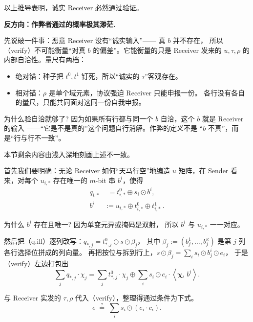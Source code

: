 以上推导表明，诚实 Receiver 必然通过验证。

\textbf{反方向：作弊者通过的概率极其渺茫.}

先说破一件事：恶意 Receiver 没有“诚实输入”------ 真 $b$ 并不存在，
所以（verify）不可能衡量“对真 $b$ 的偏差”。它能衡量的只是 Receiver
发来的 $u, \tau, \rho$ 的内部自洽性。量尺有两档：

\begin{itemize}

\item
  绝对锚：种子把 $t^0, t^1$ 钉死，所以“诚实的 $\tau$”客观存在。
\item
  相对锚：$\rho$ 是单个域元素，协议强迫 Receiver 只能申报一份。
  各行没有各自的量尺，只能共同面对这同一份自我申报。
\end{itemize}

为什么验自洽就够了? 因为如果所有行都与同一个 $b$ 自洽，这个 $b$ 就是
Receiver 的输入 ------“它是不是真的”这个问题自行消解。作弊的定义不是
“$b$ 不真”，而是“行与行不一致”。

本节剩余内容由浅入深地刻画上述不一致。

首先我们要明确：无论 Receiver 如何“天马行空”地编造 $u$ 矩阵，在
Sender 看来，对每个 $u_{i,*}$ 存在唯一的 $m$-bit 串 $b^i$，使得
\begin{align}q_{i,*} &\phantom{:}= t^0_{i,*} \oplus s_i \odot b^{i},
\\
b^i &:= u_{i,*} \oplus t^0_{i,*} \oplus t^1_{i,*} ~. \tag{q.ill}
\end{align}

为什么 $b^i$ 存在且唯一? 因为单变元异或掩码是双射，
所以 $b^i$ 与 $u_{i,*}$ 一一对应。

然后把（q.ill）逐列改写：$q_{*,j} = t^0_{*,j} \oplus s \odot \beta_j$，
其中 $\beta_j := \left(b^1_j, \ldots, b^\kappa_j\right)$ 是第 $j$ 列各行选择位拼成的列向量。
再把按位与拆到行上，$s \odot \beta_j = \sum_i s_i \odot b^i_j \odot e_i$，
于是（verify）左边打包出
\begin{equation}\label{eq:02-kos15:15}
\sum_j q_{*,j} \cdot \chi_j
= \sum_j t^0_{*,j} \cdot \chi_j
\oplus \sum_i s_i \odot e_i \cdot \left<\boldsymbol{\chi},\, b^i\right>.
\end{equation}

与 Receiver 实发的 $\tau, \rho$ 代入（verify），整理得通过条件为下式。
\begin{equation}\label{eq:02-kos15:pass}
e \;\stackrel{?}{=}\; \sum_i s_i \odot \left(e_i \cdot c_i\right). \tag{pass}
\end{equation}

